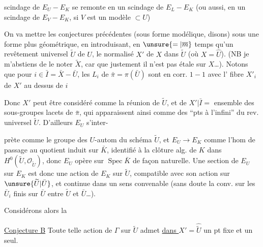 scindage de $E_U-E_K$ se remonte en un scindage de $E_L-E_K$ (ou aussi,  en un scindage de $E_V-E_K$, si $V$ est un modèle $\subset U$)

On va mettre les conjectures précédentes (sous forme modélique, disons) sous une forme plus géométrique, en introduisant, en $\unsure{=|\overline m}$ temps qu'un revêtement universel  $\widetilde U$ de $U$, le normalisé  $X'$ de $X$ dans $\widetilde U$ (où $X=\widehat U$). (NB je m'abstiens de le noter $\widetilde X$, car que justement il n'est pas étale sur $X$\ldots). Notons que pour $i\in\bar I=\bar X-\bar U$, les  $L_i$ de $\bar\pi=\pi(\bar U)$ sont en corr. $1-1$ avec l' fibre $X'_i$ de $X'$ au dessus de $i$


Donc $X'$ peut être considéré comme la réunion de $\widetilde U$, et de $X'|\bar I=$ ensemble des sous-groupes lacets de $\bar\pi$, qui apparaissent ainsi comme des ``pts à l'infini'' du rev. universel $\widetilde U$. D'ailleurs $E_U$ s'inter-

prète comme le groupe  des $U$-autom du schéma $\widetilde U$, et $E_U\longrightarrow E_K$ comme l'hom de passage au quotient induit sur $\bar K$, identifié à la clôture alg. de $K$ dans $H^0(\widetilde U,\mathcal O_{\widetilde U})$, donc $E_U$ opère sur $\operatorname{Spec}\bar K$ de façon naturelle. Une section de $E_U$ sur $E_K$ est donc une action de $E_K$ sur $\widetilde U$, compatible avec son action sur $\unsure{\widetilde U|\bar U}$, et continue dans un sens convenable (sans doute la conv.  sur les  $\bar U_i$ finis sur $\bar U$ entre $\widetilde U$ et $\bar U$\ldots).

Considérons alors la

\uline{Conjecture B} Toute telle action de $\Gamma$ sur $\widetilde U$ admet \uline{dans $X'$}$=\widehat{\widetilde U}$ un pt fixe et un seul.

